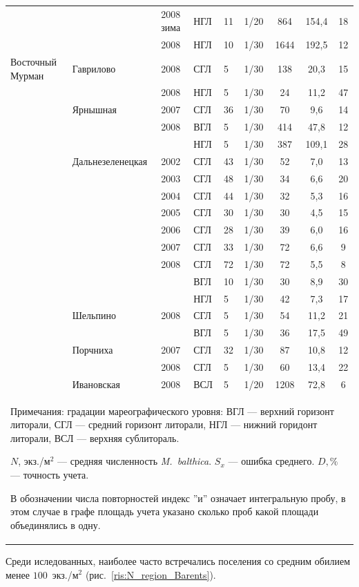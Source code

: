 \begin{footnotesize}
\begin{center}
\begin{longtable}{|p{1.6cm}|p{2.3cm}|p{1cm}|p{2cm}|p{1.5cm}|p{1.3cm}|*{3}{c|}}
		 &  & 2008 зима & НГЛ & 11 & 1/20 & 864 & 154,4 & 18
		\\ \cline{3-9}
		 &  & 2008 & НГЛ & 10 & 1/30 & 1644 & 192,5 & 12
		\\ \hline
	Восточный Мурман & Гаврилово & 2008 & СГЛ & 5 & 1/30 & 138 & 20,3 & 15
		\\ \cline{4-9}
		 &  & 2008 & НГЛ & 5 & 1/30 & 24 & 11,2 & 47
		\\ \cline{2-9}
		 & Ярнышная & 2007 & СГЛ & 36 & 1/30 & 70 & 9,6 & 14
		\\ \cline{3-9}
		 &  & 2008 & ВГЛ & 5 & 1/30 & 414 & 47,8 & 12
		\\ \cline{4-9}
		 &  & & НГЛ & 5 & 1/30 & 387 & 109,1 & 28
		\\ \cline{2-9}
		 & Даль\-не\-зе\-ле\-нец\-кая & 2002 & СГЛ & 43 & 1/30 & 52 & 7,0 & 13
		\\ \cline{3-9}
		 &  & 2003 & СГЛ & 48 & 1/30 & 34 & 6,6 & 20
		\\ \cline{3-9}
		 &  & 2004 & СГЛ & 44 & 1/30 & 32 & 5,3 & 16
		\\ \cline{3-9}
		 &  & 2005 & СГЛ & 30 & 1/30 & 30 & 4,5 & 15
		\\ \cline{3-9}
		 &  & 2006 & СГЛ & 28 & 1/30 & 39 & 6,0 & 16
		\\ \cline{3-9}
		 &  & 2007 & СГЛ & 33 & 1/30 & 72 & 6,6 & 9
		\\ \cline{3-9}
		 &  & 2008 & СГЛ & 72 & 1/30 & 72 & 5,5 & 8
		\\ \cline{4-9}
		 &  &  & ВГЛ & 10 & 1/30 & 30 & 8,9 & 30
		\\ \cline{4-9}
		 &  &  & НГЛ & 5 & 1/30 & 42 & 7,3 & 17
		\\ \cline{2-9}
		 & Шельпино & 2008 & СГЛ & 5 & 1/30 & 54 & 11,2 & 21
		\\ \cline{4-9}
		 &  &  & ВГЛ & 5 & 1/30 & 36 & 17,5 & 49
		\\ \cline{2-9}
		 & Порчниха & 2007 & СГЛ & 32 & 1/30 & 87 & 10,8 & 12
		\\ \cline{3-9}
		 &  & 2008 & СГЛ & 5 & 1/30 & 60 & 13,4 & 22
		\\ \cline{2-9}
		 & Ивановская & 2008 & ВСЛ & 5 & 1/20 & 1208 & 72,8 & 6
		\\ \hline
	\multicolumn{9}{p{16cm}}{Примечания: градации мареографического уровня: ВГЛ --- верхний горизонт литорали, СГЛ --- средний 	горизонт литорали, НГЛ --- нижний горидонт литорали, ВСЛ --- верхняя сублитораль. 

	$N$, экз./м$^2$ --- средняя численность {\it M.~balthica}. 
	$S_x$ --- ошибка среднего.
	 $D, \%$ ---  точность учета.
	
	В обозначении числа повторностей индекс ''и'' означает интегральную пробу, в этом случае в графе площадь учета указано сколько проб какой площади 	объединялись в одну.}
	\end{longtable}
\end{center}
	\end{footnotesize}
%
Среди иследованных, наиболее часто встречались поселения со средним обилием менее $100$~экз./м$^2$ (рис.~\ref{ris:N_region_Barents}).


